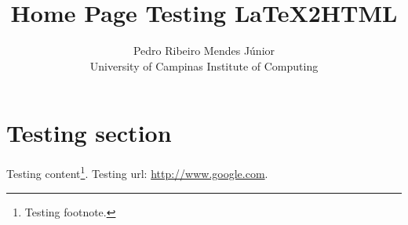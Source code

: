 \documentclass{article}
\title{Home Page Testing LaTeX2HTML}
\author{Pedro Ribeiro Mendes J\'{u}nior\\
  University of Campinas \textemdash{} Institute of Computing}
\begin{document}
\maketitle

\section{Testing section}

Testing content\footnote{Testing footnote.}.  Testing url: \url{http://www.google.com}.
\end{document}
